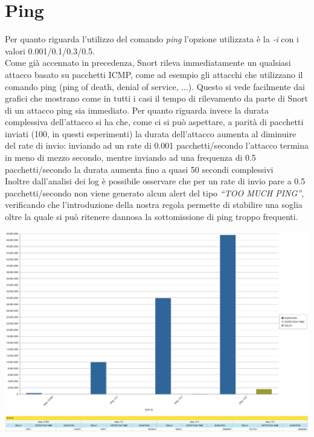 \section{Ping}
Per quanto riguarda l'utilizzo del comando \textit{ping} l'opzione utilizzata è la \textit{-i} con i valori 0.001/0.1/0.3/0.5.\\
Come già accennato in precedenza, Snort rileva immediatamente un qualsiasi attacco basato su pacchetti ICMP, come ad esempio gli attacchi che utilizzano il comando ping (ping of death, denial of service, ...). Questo si vede facilmente dai grafici che mostrano come in tutti i casi il tempo di rilevamento da parte di Snort di un attacco ping sia immediato. Per quanto riguarda invece la durata complessiva dell'attacco si ha che, come ci si può aspettare, a parità di pacchetti inviati (100, in questi esperimenti) la durata dell'attacco aumenta al diminuire del rate di invio: inviando ad un rate di 0.001 pacchetti/secondo l'attacco termina in meno di mezzo secondo, mentre inviando ad una frequenza di 0.5 pacchetti/secondo la durata aumenta fino a quasi 50 secondi complessivi\\
Inoltre dall'analisi dei log è possibile osservare che per un rate di invio pare a 0.5 pacchetti/secondo non viene generato alcun alert del tipo \textit{``TOO MUCH PING''}, verificando che l'introduzione della nostra regola permette di stabilire una soglia oltre la quale si può ritenere dannosa la sottomissione di ping troppo frequenti.

\includegraphics[scale=0.3]{figure/tempi_ping.jpg}\\

\includegraphics[scale=0.3]{figure/tabella_ping.jpg}


